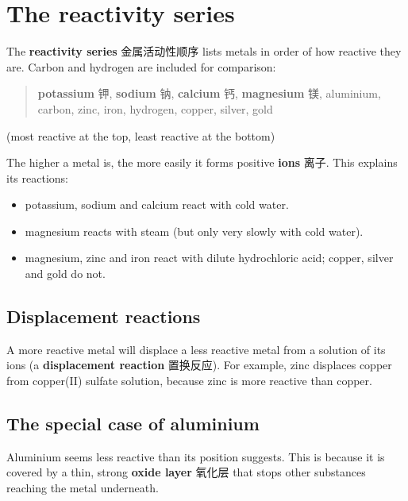 \documentclass[11pt]{article}
\begin{document}
\section*{The reactivity series}

The \textbf{reactivity series} 金属活动性顺序 lists metals in order of how reactive they are. Carbon and hydrogen are included for comparison:

\begin{quote}
\textbf{potassium} 钾, \textbf{sodium} 钠, \textbf{calcium} 钙, \textbf{magnesium} 镁, aluminium, carbon, zinc, iron, hydrogen, copper, silver, gold

\end{quote}

(most reactive at the top, least reactive at the bottom)

The higher a metal is, the more easily it forms positive \textbf{ions} 离子. This explains its reactions:

\begin{itemize}
\item potassium, sodium and calcium react with cold water.

\item magnesium reacts with steam (but only very slowly with cold water).

\item magnesium, zinc and iron react with dilute hydrochloric acid; copper, silver and gold do not.

\end{itemize}

\subsection*{Displacement reactions}

A more reactive metal will displace a less reactive metal from a solution of its ions (a \textbf{displacement reaction} 置换反应). For example, zinc displaces copper from copper(II) sulfate solution, because zinc is more reactive than copper.

\subsection*{The special case of aluminium}

Aluminium seems less reactive than its position suggests. This is because it is covered by a thin, strong \textbf{oxide layer} 氧化层 that stops other substances reaching the metal underneath.
\end{document}
